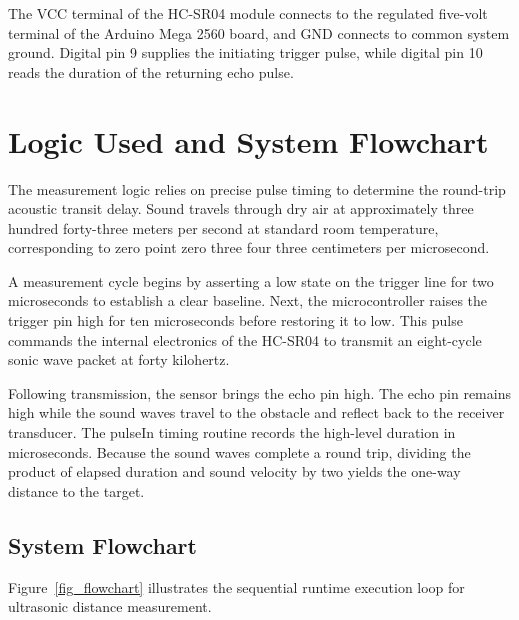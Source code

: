 \documentclass[11pt,a4paper]{article}
\begin{document}
The VCC terminal of the HC-SR04 module connects to the regulated five-volt terminal of the Arduino Mega 2560 board, and GND connects to common system ground. Digital pin 9 supplies the initiating trigger pulse, while digital pin 10 reads the duration of the returning echo pulse.

\section{Logic Used and System Flowchart}
The measurement logic relies on precise pulse timing to determine the round-trip acoustic transit delay. Sound travels through dry air at approximately three hundred forty-three meters per second at standard room temperature, corresponding to zero point zero three four three centimeters per microsecond.

A measurement cycle begins by asserting a low state on the trigger line for two microseconds to establish a clear baseline. Next, the microcontroller raises the trigger pin high for ten microseconds before restoring it to low. This pulse commands the internal electronics of the HC-SR04 to transmit an eight-cycle sonic wave packet at forty kilohertz.

Following transmission, the sensor brings the echo pin high. The echo pin remains high while the sound waves travel to the obstacle and reflect back to the receiver transducer. The pulseIn timing routine records the high-level duration in microseconds. Because the sound waves complete a round trip, dividing the product of elapsed duration and sound velocity by two yields the one-way distance to the target.

\subsection{System Flowchart}
Figure~\ref{fig_flowchart} illustrates the sequential runtime execution loop for ultrasonic distance measurement.
\end{document}
